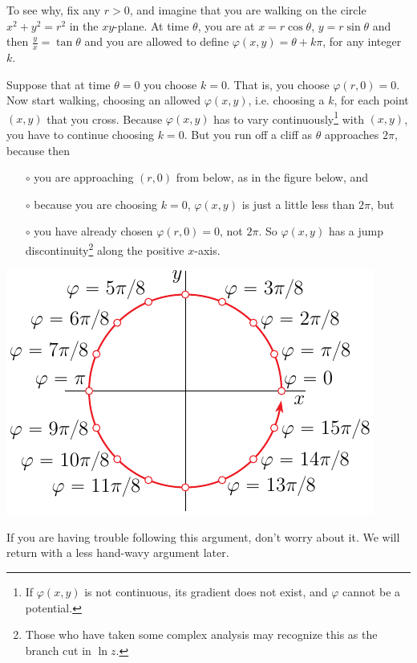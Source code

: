 \begin{eg}
To see why, fix any $r>0$, and imagine that you are walking on the circle
$x^2+y^2=r^2$ in the $xy$-plane. At time $\theta$, you are at $x=r\cos\theta$,
$y=r\sin\theta$ and then $\frac{y}{x} = \tan\theta$ and you are allowed to 
define $\varphi(x,y)=\theta+k\pi$, for any integer $k$.

 Suppose that at time $\theta=0$ you choose $k=0$. That is, you choose $\varphi(r,0)=0$.
Now start walking, choosing an allowed $\varphi(x,y)$, i.e. choosing a $k$, 
for each point $(x,y)$ that you cross.
Because $\varphi(x,y)$ has to vary continuously\footnote{If $\varphi(x,y)$
is not continuous, its gradient does not exist, and $\varphi$ cannot be 
a potential.} with $(x,y)$, you 
have to continue choosing $k=0$. But you run off a cliff as $\theta$ 
approaches $2\pi$, because then
\begin{itemize}
\item[$\circ$] 
you are approaching $(r,0)$ from below, as in the figure below, and
\item[$\circ$]
because you are choosing $k=0$, $\varphi(x,y)$ is just a little less than 
$2\pi$, but
\item[$\circ$]
you have already chosen $\varphi(r,0)=0$, not $2\pi$.
So $\varphi(x,y)$ has a jump discontinuity\footnote{Those who have taken
some complex analysis may recognize this as the branch cut in $\ln z$.} 
along the positive $x$-axis.
\end{itemize}
\begin{efig}
\begin{center}
    \includegraphics{notConservative.pdf}
\end{center}
\end{efig}
If you are having trouble following this argument, don't worry about it.
We will return with a less hand-wavy argument later.
\end{eg}


